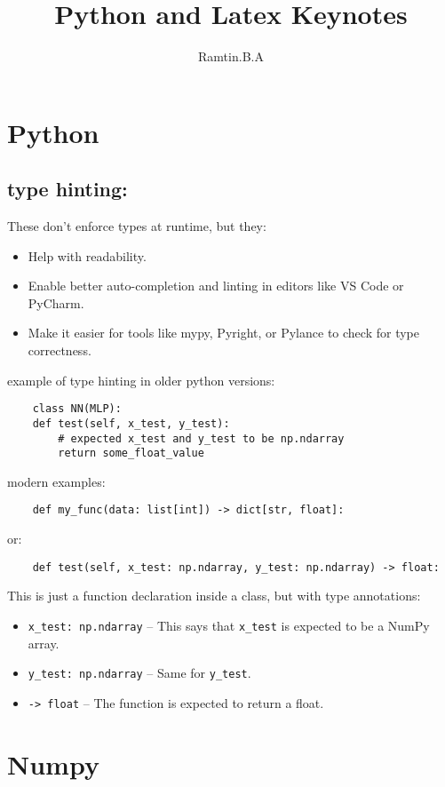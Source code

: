 \documentclass{article}
\title{Python and Latex Keynotes}
\author{Ramtin.B.A}
\begin{document}
\maketitle


\section{Python}
\subsection{type hinting:}

These don’t enforce types at runtime, but they:
\begin{itemize}
\item Help with readability.  
\item Enable better auto-completion and linting in editors like VS Code or PyCharm.
\item Make it easier for tools like mypy, Pyright, or Pylance to check for type correctness.
\end{itemize}

example of type hinting in older python versions:
\begin{lstlisting}
    class NN(MLP):
    def test(self, x_test, y_test):
        # expected x_test and y_test to be np.ndarray
        return some_float_value

\end{lstlisting}
  
modern examples:
\begin{lstlisting}
    def my_func(data: list[int]) -> dict[str, float]:
\end{lstlisting}
or:
\begin{lstlisting}
    def test(self, x_test: np.ndarray, y_test: np.ndarray) -> float:
\end{lstlisting}

This is just a function declaration inside a class, but with type annotations:

\begin{itemize}
    \item \texttt{x\_test: np.ndarray} – This says that \texttt{x\_test} is expected to be a NumPy array.
    \item \texttt{y\_test: np.ndarray} – Same for \texttt{y\_test}.
    \item \texttt{-> float} – The function is expected to return a float.
\end{itemize}
  

\section{Numpy}
\end{document}
